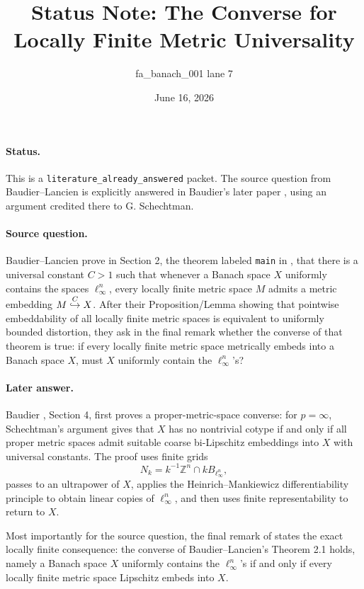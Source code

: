 \documentclass[11pt]{article}
\title{Status Note: The Converse for Locally Finite Metric Universality}
\author{fa\_banach\_001 lane 7}
\date{June 16, 2026}
\begin{document}
\maketitle

\paragraph{Status.}
This is a \texttt{literature\_already\_answered} packet.  The source question
from Baudier--Lancien \cite{BL} is explicitly answered in Baudier's later paper
\cite{B09}, using an argument credited there to G. Schechtman.

\paragraph{Source question.}
Baudier--Lancien prove in Section 2, the theorem labeled \texttt{main} in
\cite{BL}, that
there is a universal constant \(C>1\) such that whenever a Banach space \(X\)
uniformly contains the spaces \(\ell_\infty^n\), every locally finite metric
space \(M\) admits a metric embedding \(M \buildrel C \over \hookrightarrow X\).
After their Proposition/Lemma showing that pointwise embeddability of all
locally finite metric spaces is equivalent to uniformly bounded distortion,
they ask in the final remark whether the converse of that theorem is true:
if every locally finite metric space metrically embeds into a Banach space
\(X\), must \(X\) uniformly contain the \(\ell_\infty^n\)'s?

\paragraph{Later answer.}
Baudier \cite{B09}, Section 4, first proves a proper-metric-space converse:
for \(p=\infty\), Schechtman's argument gives that \(X\) has no nontrivial
cotype if and only if all proper metric spaces admit suitable coarse
bi-Lipschitz embeddings into \(X\) with universal constants.  The proof uses
finite grids
\[
  N_k = k^{-1}\mathbb Z^n \cap k B_{\ell_\infty^n},
\]
passes to an ultrapower of \(X\), applies the Heinrich--Mankiewicz
differentiability principle to obtain linear copies of \(\ell_\infty^n\), and
then uses finite representability to return to \(X\).

Most importantly for the source question, the final remark of \cite{B09}
states the exact locally finite consequence: the converse of Baudier--Lancien's
Theorem 2.1 holds, namely a Banach space \(X\) uniformly contains the
\(\ell_\infty^n\)'s if and only if every locally finite metric space
Lipschitz embeds into \(X\).
\end{document}
